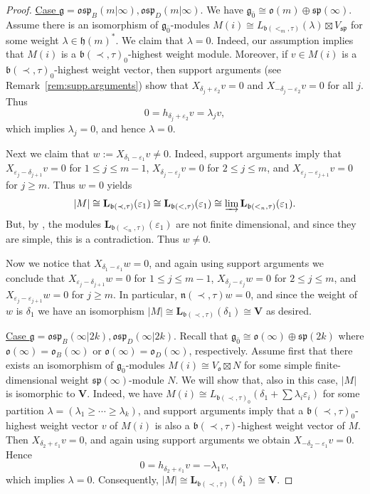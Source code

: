 \documentclass[12pt]{amsart}
\newcommand\g{\mathfrak{g}}
\newcommand\fh{\mathfrak{h}}
\newcommand\fn{\mathfrak{n}}
\newcommand\fb{\mathfrak{b}}
\newcommand\fsp{\mathfrak{sp}}
\newcommand\fosp{\mathfrak{osp}}
\newcommand\fo{\mathfrak{o}}
\newcommand\bV{\mathbf{V}}
\newcommand\bL{\mathbf{L}}
\theoremstyle{plain}
\theoremstyle{definition}
\numberwithin{equation}{section}
\begin{document}
\begin{proof}
\underline{Case $\g = \fosp_B(m|\infty), \fosp_D(m|\infty)$}. We have $\g_{\bar 0} \cong \fo(m)\oplus \fsp(\infty)$. Assume there is an isomorphism of $\g_{\bar 0}$-modules $M(i)\cong L_{\fb(<_m, \tau)}(\lambda)\boxtimes V_\fsp$ for some weight $\lambda\in \fh(m)^*$. We claim that $\lambda=0$. Indeed, our assumption implies that $M(i)$ is a $\fb(\prec,\tau)_0$-highest weight module.  Moreover, if $v\in M(i)$ is a $\fb(\prec,\tau)_0$-highest weight vector, then support arguments (see Remark~\ref{rem:supp.arguments}) show that $X_{\delta_j + \varepsilon_2}v=0$ and $X_{-\delta_j - \varepsilon_2}v=0$ for all $j$. Thus
	\[
0=h_{\delta_j + \varepsilon_2}v=\lambda_j v,
	\]
which implies $\lambda_j=0$, and hence $\lambda=0$. 

Next we claim that $w:=X_{\delta_1 - \varepsilon_1}v\neq 0$. Indeed, support arguments imply that $X_{\varepsilon_j - \delta_{j+1}}v=0$ for $1\leq j\leq m-1$, $X_{\delta_j - \varepsilon_j}v=0$ for $2\leq j\leq m$, and $X_{\varepsilon_j - \varepsilon_{j+1}}v=0$ for $j\geq m$. Thus $w =0$ yields 
	\[
|M|\cong \bL_{\fb(\prec, \tau)}(\varepsilon_1)\cong \bL_{\fb(<,\tau)}(\varepsilon_1) \cong \varinjlim \bL_{\fb(<_n,\tau)}(\varepsilon_1).
	\]
But, by \cite[Proposition~2.3]{Kac78}, the modules $\bL_{\fb(<_n,\tau)}(\varepsilon_1)$ are not finite dimensional, and since they are simple, this is a contradiction. Thus $w\neq 0$.

Now we notice that $X_{\delta_1 - \varepsilon_1} w=0$, and again using support arguments we conclude that $X_{\varepsilon_j - \delta_{j+1}}w=0$ for $1\leq j\leq m-1$, $X_{\delta_j - \varepsilon_j}w=0$ for $2\leq j\leq m$, and $X_{\varepsilon_j - \varepsilon_{j+1}}w=0$ for $j\geq m$. In particular, $\fn(\prec,\tau) w =0$, and since the weight of $w$ is $\delta_1$ we have an isomorphism $|M| \cong \bL_{\fb(\prec, \tau)}(\delta_1)\cong \bV$ as  desired.

\underline{Case $\g = \fosp_B(\infty|2k), \fosp_D(\infty|2k)$}. Recall that $\g_{\bar 0} \cong \fo(\infty)\oplus \fsp(2k)$ where $\fo(\infty) = \fo_B(\infty)$ or $\fo(\infty) = \fo_D(\infty)$, respectively. Assume first that there exists an isomorphism of $\g_{\bar 0}$-modules  $M(i)\cong V_\fo \boxtimes N$ for some simple finite-dimensional weight $\fsp(\infty)$-module $N$. We will show that, also in this case, $|M|$ is isomorphic to $\bV$. Indeed, we have $M(i)\cong L_{\fb(\prec,\tau)_0}(\delta_1 + \sum \lambda_i\varepsilon_i)$ for some partition $\lambda = (\lambda_1\geq \cdots\geq \lambda_k)$, and support arguments imply that a $\fb(\prec,\tau)_0$-highest weight vector $v$ of $M(i)$ is also a $\fb(\prec,\tau)$-highest weight vector of $M$. Then $X_{\delta_2 + \varepsilon_1} v=0$,  and again using support arguments we obtain $X_{-\delta_2 - \varepsilon_1} v=0$. Hence 
	\[
0=h_{\delta_2+\varepsilon_1}v = -\lambda_1 v,
	\]
which implies $\lambda = 0$. Consequently, $|M|\cong \bL_{\fb(\prec,\tau)} (\delta_1)\cong \bV$.


\end{proof}
\end{document}
